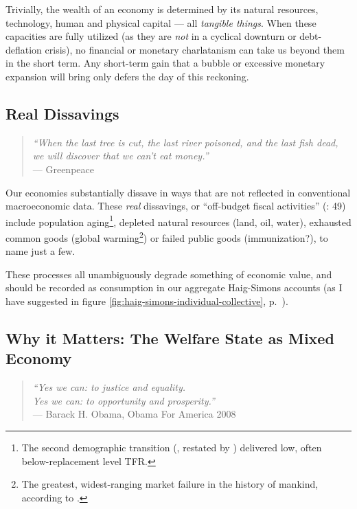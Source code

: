 Trivially, the wealth of an economy is determined by its natural resources, technology, human and physical capital --- all \emph{tangible things}. When these capacities are fully utilized (as they are \emph{not} in a cyclical downturn or debt-deflation crisis), no financial or monetary charlatanism can take us beyond them in the short term. Any short-term gain that a bubble or excessive monetary expansion will bring only defers the day of this reckoning.

\subsection{Real Dissavings} \label{sec:realdissavings}

\begin{quote}
	\emph{``When the last tree is cut, the last river poisoned, and the last fish dead, we will discover that we can't eat money.''\\}
	--- Greenpeace
\end{quote}

Our economies substantially dissave in ways that are not reflected in conventional macroeconomic data. These \emph{real} dissavings, or ``off-budget fiscal activities'' (\citealt{Bonker2006}: 49) include population aging\footnote{
	The second demographic transition (\citealt{Davis1945}, restated by \citealt{Caldwell-1976-aa}) delivered low, often below-replacement level \gls{TFR}.}, 
depleted natural resources (land, oil, water), exhausted common goods (global warming\footnote{
	The greatest, widest-ranging market failure in the history of mankind, according to \cite{Stern-2006-aa}.}) 
or failed public goods (immunization?), to name just a few. 

These processes all unambiguously degrade something of economic value, and should be recorded as consumption in our aggregate Haig-Simons accounts (as I have suggested in figure \ref{fig:haig-simons-individual-collective}, p.~\pageref{fig:haig-simons-individual-collective}). %

\subsection[Why it Matters]{Why it Matters: The Welfare State as Mixed Economy} \label{sec:why-mixed-economy-matters}

\begin{quote}
	\emph{``Yes we can: to justice and equality.\\ Yes we can: to opportunity and prosperity.''\\}
	--- Barack H. Obama, Obama For America 2008
\end{quote} %

